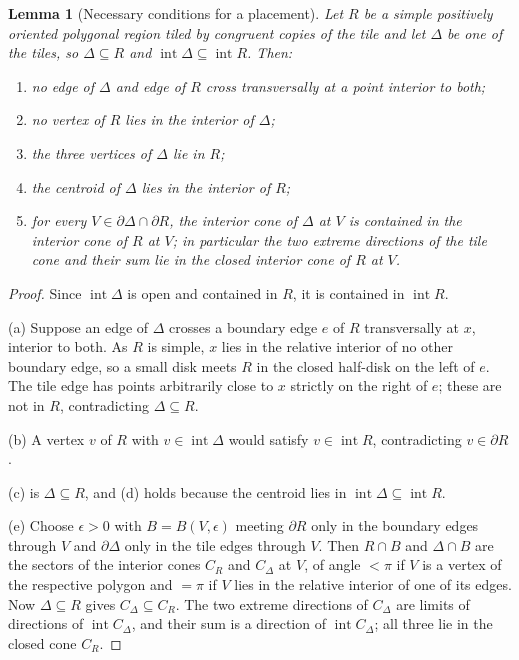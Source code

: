 \documentclass[11pt]{amsart}
\newtheorem{lemma}[theorem]{Lemma}
\theoremstyle{definition}
\theoremstyle{remark}
\begin{document}
\begin{lemma}[Necessary conditions for a placement]\label{lem:fit}
Let $R$ be a simple positively oriented polygonal region tiled by congruent
copies of the tile and let $\Delta$ be one of the tiles, so $\Delta\subseteq
R$ and $\operatorname{int}\Delta\subseteq\operatorname{int}R$.  Then:
\begin{enumerate}[label=\textup{(\alph*)}]
\item no edge of $\Delta$ and edge of $R$ cross transversally at a point
      interior to both;
\item no vertex of $R$ lies in the interior of $\Delta$;
\item the three vertices of $\Delta$ lie in $R$;
\item the centroid of $\Delta$ lies in the interior of $R$;
\item for every $V\in\partial\Delta\cap\partial R$, the interior cone of
      $\Delta$ at $V$ is contained in the interior cone of $R$ at $V$; in
      particular the two extreme directions of the tile cone and their sum
      lie in the closed interior cone of $R$ at $V$.
\end{enumerate}
\end{lemma}

\begin{proof}
Since $\operatorname{int}\Delta$ is open and contained in $R$, it is
contained in $\operatorname{int}R$.

(a) Suppose an edge of $\Delta$ crosses a boundary edge $e$ of $R$
transversally at $x$, interior to both.  As $R$ is simple, $x$ lies in the
relative interior of no other boundary edge, so a small disk meets $R$ in the
closed half-disk on the left of $e$.  The tile edge has points arbitrarily
close to $x$ strictly on the right of $e$; these are not in $R$,
contradicting $\Delta\subseteq R$.

(b) A vertex $v$ of $R$ with $v\in\operatorname{int}\Delta$ would satisfy
$v\in\operatorname{int}R$, contradicting $v\in\partial R$.

(c) is $\Delta\subseteq R$, and (d) holds because the centroid lies in
$\operatorname{int}\Delta\subseteq\operatorname{int}R$.

(e) Choose $\epsilon>0$ with $B=B(V,\epsilon)$ meeting $\partial R$ only in
the boundary edges through $V$ and $\partial\Delta$ only in the tile edges
through $V$.  Then $R\cap B$ and $\Delta\cap B$ are the sectors of the
interior cones $C_R$ and $C_\Delta$ at $V$, of angle $<\pi$ if $V$ is a
vertex of the respective polygon and $=\pi$ if $V$ lies in the relative
interior of one of its edges.  Now $\Delta\subseteq R$ gives
$C_\Delta\subseteq C_R$.  The two extreme directions of $C_\Delta$ are
limits of directions of $\operatorname{int}C_\Delta$, and their sum is a
direction of $\operatorname{int}C_\Delta$; all three lie in the closed cone
$C_R$.
\end{proof}
\end{document}
